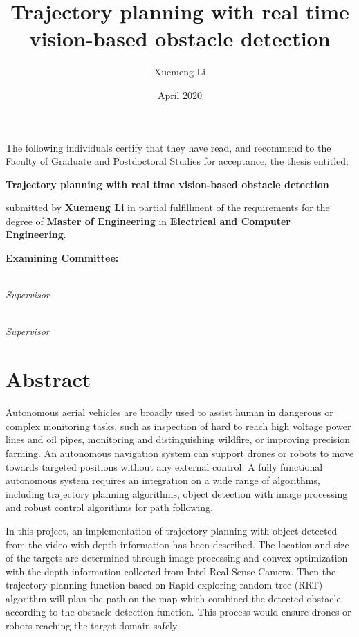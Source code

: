 \documentclass[
  oneside]{ubcthesis}
\title{Trajectory planning with real time vision-based obstacle detection}
\author{Xuemeng Li}
\date{April 2020}
\begin{document}
\maketitle


\noindent The following individuals certify that they have read,
and recommend to the Faculty of Graduate and Postdoctoral Studies
for acceptance, the thesis entitled:

\begin{center}
{\large \textbf{Trajectory planning with real time vision-based obstacle detection}}
\end{center}

submitted by \textbf{Xuemeng Li} in partial fulfillment of the requirements for the degree of \textbf{Master of Engineering} in \textbf{Electrical and Computer Engineering}.%
\par\bigskip%

\noindent\textbf{Examining Committee:}%
\par\medskip{}\\\emph{Supervisor}
\par\medskip{}\\\emph{Supervisor}
\cleardoublepage

\chapter{Abstract}

Autonomous aerial vehicles are broadly used to assist human in dangerous or complex monitoring tasks, such as inspection of hard to reach high voltage power lines and oil pipes, monitoring and distinguishing wildfire, or improving precision farming. An autonomous navigation system can support drones or robots to move towards targeted positions without any external control. A fully functional autonomous system requires an integration on a wide range of algorithms, including trajectory planning algorithms, object detection with image processing and robust control algorithms for path following. 

In this project, an implementation of trajectory planning with object detected from the video with depth information has been described. The location and size of the targets are determined through image processing and convex optimization with the depth information collected from Intel Real Sense Camera. Then the trajectory planning function based on Rapid-exploring random tree (RRT) algorithm will plan the path on the map which combined the detected obstacle according to the obstacle detection function. This process would ensure drones or robots reaching the target domain safely.
\end{document}
